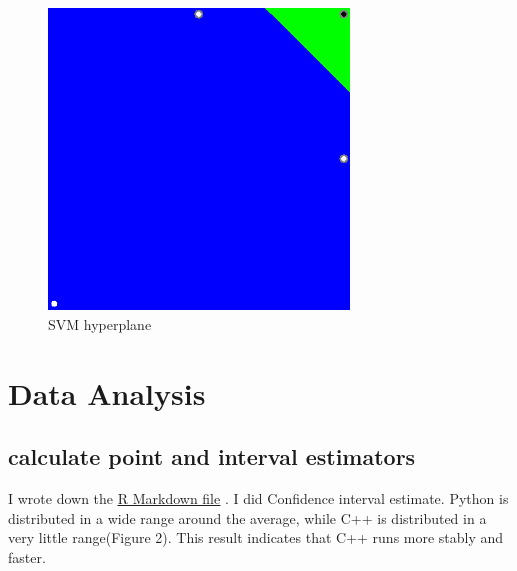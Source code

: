 \documentclass[11pt, a4paper]{article}
\begin{document}
\begin{figure}[htbp]
\centering
\includegraphics[clip, width=80mm]{result.png}
\caption{SVM hyperplane}
\end{figure}

\section{Data Analysis}
\subsection{calculate point and interval estimators}

I wrote down the \href{https://github.com/Rintarooo/time_cpp_python/blob/master/rmarkdown/ds.Rmd}{\underline{R Markdown file}} . I did Confidence interval estimate. Python is distributed in a wide range around the average, while C++ is distributed in a very little range(Figure 2). This result indicates that C++ runs more stably and faster. 

%

\end{document}

